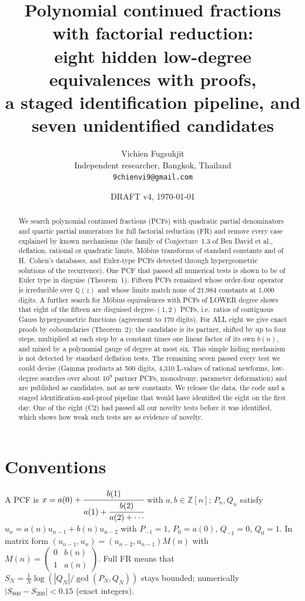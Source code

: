 \documentclass[11pt]{article}
\title{Polynomial continued fractions with factorial reduction:\\ eight hidden low-degree equivalences with proofs,\\ a staged identification pipeline, and seven unidentified candidates}
\author{Vichien Fugsukjit\\ Independent researcher, Bangkok, Thailand\\ \texttt{9chienvi9@gmail.com}}
\date{DRAFT v4, \today}
\begin{document}
\maketitle
\begin{abstract}
We search polynomial continued fractions (PCFs) with quadratic partial denominators and quartic partial numerators for full
factorial reduction (FR) and remove every case explained by known mechanisms (the family of Conjecture~1.3 of Ben David et al.,
deflation, rational or quadratic limits, M\"obius transforms of standard constants and of H.~Cohen's databases, and Euler-type
PCFs detected through hypergeometric solutions of the recurrence). One PCF that passed all numerical tests is shown to be of Euler
type in disguise (Theorem~1). Fifteen PCFs remained whose order-four operator is irreducible over $\mathbb Q(z)$ and whose limits
match none of 21{,}984 constants at 1{,}000 digits. A further search for M\"obius equivalences with PCFs of LOWER degree shows that
eight of the fifteen are disguised degree-$(1,2)$ PCFs, i.e.\ ratios of contiguous Gauss hypergeometric functions (agreement to
170 digits). For ALL eight we give exact proofs by coboundaries (Theorem~2): the candidate is its partner, shifted by up to
four steps, multiplied at each step by a constant times one linear factor of its own $b(n)$, and mixed by a polynomial gauge of
degree at most six. This simple hiding mechanism is not detected by standard deflation tests. The remaining seven passed every test we could devise (Gamma products at 500 digits,
4{,}310 L-values of rational newforms, low-degree searches over about $10^9$ partner PCFs, monodromy, parameter deformation)
and are published as candidates, not as new constants. We release the data, the code and a staged identification-and-proof
pipeline that would have identified the eight on the first day. One of the eight (C2) had passed all our
novelty tests before it was identified, which shows how weak such tests are as evidence of novelty.
\end{abstract}

\section{Conventions}
A PCF is $x=a(0)+\cfrac{b(1)}{a(1)+\cfrac{b(2)}{a(2)+\cdots}}$ with $a,b\in\mathbb Z[n]$; $P_n,Q_n$ satisfy $u_n=a(n)u_{n-1}+b(n)u_{n-2}$
with $P_{-1}=1$, $P_0=a(0)$, $Q_{-1}=0$, $Q_0=1$. In matrix form $(u_{n-1},u_n)=(u_{n-2},u_{n-1})M(n)$ with $M(n)=\left(\begin{smallmatrix}0&b(n)\\1&a(n)\end{smallmatrix}\right)$.
Full FR means that $S_N=\frac1N\log(|Q_N|/\gcd(P_N,Q_N))$ stays bounded; numerically $|S_{800}-S_{200}|<0.15$ (exact integers).
\end{document}
